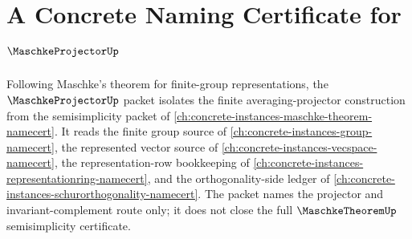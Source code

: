\chapter{A Concrete Naming Certificate for $\MaschkeProjectorUp$}
\label{ch:concrete-instances-maschke-projector-namecert}

Following Maschke's theorem for finite-group representations, the $\MaschkeProjectorUp$ packet isolates the finite averaging-projector construction from the semisimplicity packet of \autoref{ch:concrete-instances-maschke-theorem-namecert}. It reads the finite group source of \autoref{ch:concrete-instances-group-namecert}, the represented vector source of \autoref{ch:concrete-instances-vecspace-namecert}, the representation-row bookkeeping of \autoref{ch:concrete-instances-representationring-namecert}, and the orthogonality-side ledger of \autoref{ch:concrete-instances-schurorthogonality-namecert}. The packet names the projector and invariant-complement route only; it does not close the full $\MaschkeTheoremUp$ semisimplicity certificate.

